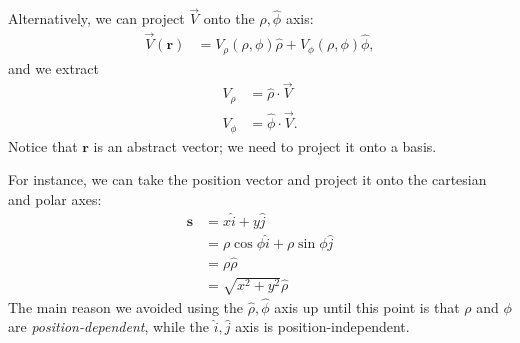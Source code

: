 \documentclass[10pt]{mypackage}
\begin{document}
Alternatively, we can project $ \vec{V} $ onto the $\widehat\rho,\widehat\phi$ axis:
\begin{align*}
  \vec{V}(\mathbf{r}) &= V_{\rho}\left(\rho,\phi\right)\widehat{\rho} + V_{\phi}\left(\rho,\phi\right)\widehat{\phi},
\end{align*}
and we extract
\begin{align*}
  V_{\rho} &= \widehat{\rho}\cdot \vec{V}\\
  V_{\phi} &= \widehat{\phi}\cdot \vec{V}.
\end{align*}
Notice that $\mathbf{r}$ is an abstract vector; we need to project it onto a basis.\newline

For instance, we can take the position vector and project it onto the cartesian and polar axes:
\begin{align*}
  \mathbf{s} &= x\widehat{i} + y\widehat{j}\\
             &= \rho \cos \phi \widehat{i} + \rho \sin \phi \widehat{j}\\
             &= \rho \widehat{\rho}\\
             &= \sqrt{x^2 + y^2}\widehat{\rho}
\end{align*}
The main reason we avoided using the $\widehat\rho,\widehat\phi$ axis up until this point is that $\rho$ and $\phi$ are \textit{position-dependent}, while the $\widehat{i},\widehat{j}$ axis is position-independent.\newline
\end{document}
